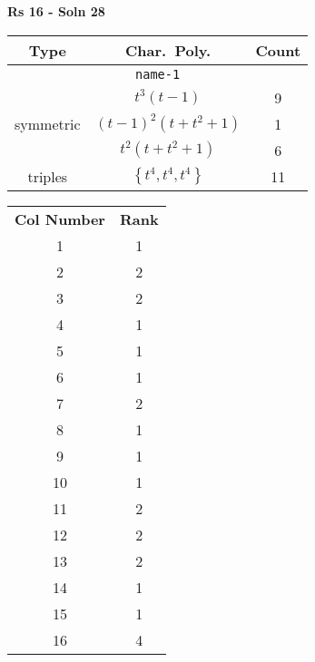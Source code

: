 \documentclass{article}
\begin{document}
    \textbf{Rs 16 - Soln 28}
    \begin{table}
    \begin{tabular}{|c|c|c|}
    \hline
    \textbf{Type} & \textbf{Char.~Poly.} & \textbf{Count} \\
    \hline \multicolumn{3}{|c|}{\texttt{name-1}} \\ \hline
    \multirow{3}{*}{symmetric}
    & $t^3(t - 1)$ & 9 \\
    & $(t - 1)^2(t + t^2 + 1)$ & 1 \\
    & $t^2(t + t^2 + 1)$ & 6 \\
    \hline
    \multirow{1}{*}{triples}
    & $\left\{t^4,t^4,t^4\right\}$ & 11 \\
    \hline
    \end{tabular}
    \end{table}
    \begin{table}
    \begin{tabular}{|c|c|}
    \hline
    \textbf{Col Number} & \textbf{Rank}\\
    1 & 1 \\ 
    2 & 2 \\ 
    3 & 2 \\ 
    4 & 1 \\ 
    5 & 1 \\ 
    6 & 1 \\ 
    7 & 2 \\ 
    8 & 1 \\ 
    9 & 1 \\ 
    10 & 1 \\ 
    11 & 2 \\ 
    12 & 2 \\ 
    13 & 2 \\ 
    14 & 1 \\ 
    15 & 1 \\ 
    16 & 4 \\ 
    \hline
    \end{tabular}
    \end{table}
    \newpage
\end{document}
